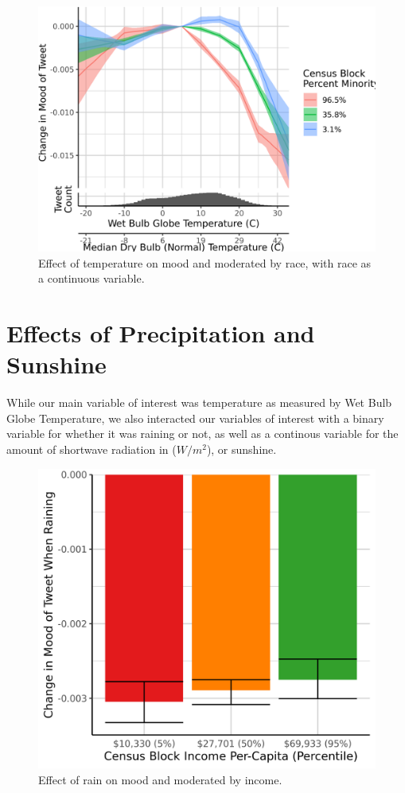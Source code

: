 \documentclass[9pt,twoside,lineno]{pnas-new}
\begin{document}
\begin{figure}[H]
  \centering
  \includegraphics[width=0.6\linewidth]{../../../res/wbgt-race.png}
  \caption{Effect of temperature on mood and moderated by race, with race as a continuous variable.}
\end{figure}

\newpage
\section*{Effects of Precipitation and Sunshine}
While our main variable of interest was temperature as measured by Wet Bulb Globe Temperature, we also interacted our variables of interest with a binary variable for whether it was raining or not, as well as a continous variable for the amount of shortwave radiation in ($W/m^2$), or sunshine.

\begin{figure}[H]
  \centering
  \includegraphics[width=0.6\linewidth]{../../../res/raining-income.png}
  \caption{Effect of rain on mood and moderated by income.}
  \label{fig:timeseries}
\end{figure}
\end{document}
